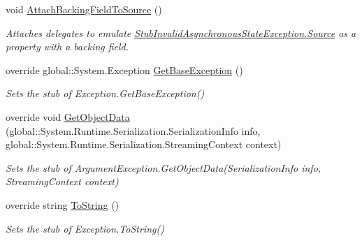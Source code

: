 \begin{DoxyCompactItemize}
void \hyperlink{class_system_1_1_component_model_1_1_fakes_1_1_stub_invalid_asynchronous_state_exception_a910cac1868bd7278f038c7b5a66809ab}{Attach\-Backing\-Field\-To\-Source} ()
\begin{DoxyCompactList}\small\item\em Attaches delegates to emulate \hyperlink{class_system_1_1_component_model_1_1_fakes_1_1_stub_invalid_asynchronous_state_exception_a4b4fd26d65318219d558eb14a0ca1519}{Stub\-Invalid\-Asynchronous\-State\-Exception.\-Source} as a property with a backing field.\end{DoxyCompactList}\item 
override global\-::\-System.\-Exception \hyperlink{class_system_1_1_component_model_1_1_fakes_1_1_stub_invalid_asynchronous_state_exception_aed88ec347334f962073a290c5cd8e527}{Get\-Base\-Exception} ()
\begin{DoxyCompactList}\small\item\em Sets the stub of Exception.\-Get\-Base\-Exception()\end{DoxyCompactList}\item 
override void \hyperlink{class_system_1_1_component_model_1_1_fakes_1_1_stub_invalid_asynchronous_state_exception_aa0e186964d60428ff1caa949cfdaf6b7}{Get\-Object\-Data} (global\-::\-System.\-Runtime.\-Serialization.\-Serialization\-Info info, global\-::\-System.\-Runtime.\-Serialization.\-Streaming\-Context context)
\begin{DoxyCompactList}\small\item\em Sets the stub of Argument\-Exception.\-Get\-Object\-Data(\-Serialization\-Info info, Streaming\-Context context)\end{DoxyCompactList}\item 
override string \hyperlink{class_system_1_1_component_model_1_1_fakes_1_1_stub_invalid_asynchronous_state_exception_a738d72ed7de482ef50243a3d1f35d341}{To\-String} ()
\begin{DoxyCompactList}\small\item\em Sets the stub of Exception.\-To\-String()\end{DoxyCompactList}\end{DoxyCompactItemize}
